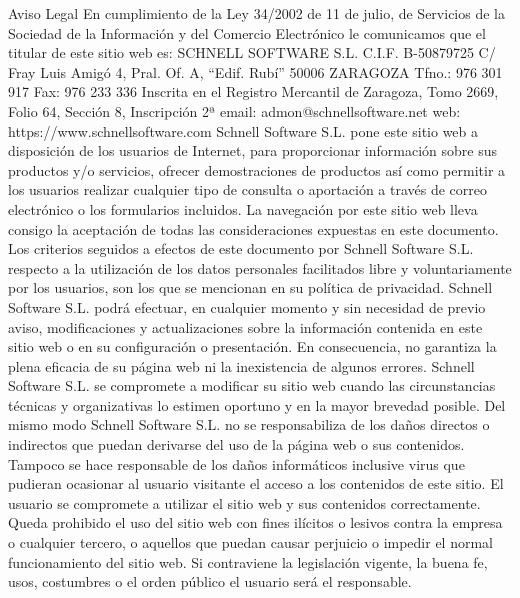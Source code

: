 \documentclass[10pt,a4paper]{article}
\begin{document}
\begin{enumerate}
Aviso Legal
En cumplimiento de la Ley 34/2002 de 11 de julio, de Servicios de la Sociedad de la Información y del Comercio Electrónico le comunicamos que el titular de este sitio web es:
SCHNELL SOFTWARE S.L.
C.I.F. B-50879725
C/ Fray Luis Amigó 4, Pral. Of. A, “Edif. Rubí”
50006 ZARAGOZA
Tfno.: 976 301 917 Fax: 976 233 336
Inscrita en el Registro Mercantil de Zaragoza, Tomo 2669, Folio 64, Sección 8, Inscripción 2ª
email: admon@schnellsoftware.net
web: https://www.schnellsoftware.com
Schnell Software S.L. pone este sitio web a disposición de los usuarios de Internet, para proporcionar información sobre sus productos y/o servicios, ofrecer demostraciones de productos así como permitir a los usuarios realizar cualquier tipo de consulta o aportación a través de correo electrónico o los formularios incluidos.
La navegación por este sitio web lleva consigo la aceptación de todas las consideraciones expuestas en este documento.
Los criterios seguidos a efectos de este documento por Schnell Software S.L. respecto a la utilización de los datos personales facilitados libre y voluntariamente por los usuarios, son los que se mencionan en su política de privacidad.
Schnell Software S.L. podrá efectuar, en cualquier momento y sin necesidad de previo aviso, modificaciones y actualizaciones sobre la información contenida en este sitio web o en su configuración o presentación. En consecuencia, no garantiza la plena eficacia de su página web ni la inexistencia de algunos errores. Schnell Software S.L. se compromete a modificar su sitio web cuando las circunstancias técnicas y organizativas lo estimen oportuno y en la mayor brevedad posible.
Del mismo modo Schnell Software S.L. no se responsabiliza de los daños directos o indirectos que puedan derivarse del uso de la página web o sus contenidos. Tampoco se hace responsable de los daños informáticos inclusive virus que pudieran ocasionar al usuario visitante el acceso a los contenidos de este sitio.
El usuario se compromete a utilizar el sitio web y sus contenidos correctamente. Queda prohibido el uso del sitio web con fines ilícitos o lesivos contra la empresa o cualquier tercero, o aquellos que puedan causar perjuicio o impedir el normal funcionamiento del sitio web. Si contraviene la legislación vigente, la buena fe, usos, costumbres o el orden público el usuario será el responsable.

\end{enumerate}
\end{document}
